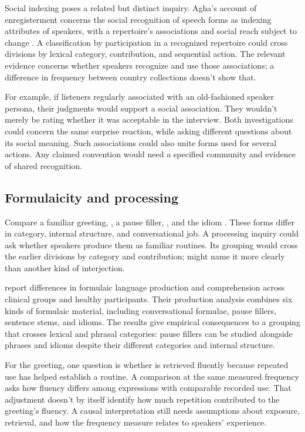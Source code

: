 \documentclass[12pt]{article}
\begin{document}
Social indexing poses a related but distinct inquiry. Agha's account
of enregisterment concerns the social recognition of speech forms as
indexing attributes of speakers, with a repertoire's associations and
social reach subject to change \citep[38--40]{agha2005}. A classification
by participation in a recognized repertoire could cross divisions by
lexical category, contribution, and sequential action. The relevant evidence concerns
whether speakers recognize and use those associations; a difference in
frequency between country collections doesn't show that.

For example, if listeners regularly associated  with an
old-fashioned speaker persona, their judgments would support a social
association. They wouldn't merely be rating whether it was acceptable
in the interview. Both investigations could concern the same surprise
reaction, while asking different questions about its social meaning.
Such associations could also unite forms used for several actions.
Any claimed convention would need a specified community and evidence
of shared recognition.

\subsection{Formulaicity and processing}

Compare a familiar greeting, , a pause filler,
, and the idiom . These forms differ
in category, internal structure, and conversational job. A processing inquiry
could ask whether speakers produce them as familiar routines.
Its grouping would cross the earlier divisions by category and contribution;
 might name it more clearly than another
kind of interjection.

\textcite{vanlanckersidtis2015} report differences in formulaic
language production and comprehension across clinical groups and
healthy participants. Their production
analysis combines six kinds of formulaic material, including conversational
formulae, pause fillers, sentence stems, and idioms. The results give
empirical consequences to a grouping that crosses lexical and phrasal
categories: pause fillers can be studied alongside phrases and idioms
despite their different categories and internal structure.

For the greeting, one question is whether  is
retrieved fluently because repeated use has helped establish a routine.
A comparison at the same measured frequency asks how fluency differs
among expressions with comparable recorded use. That adjustment doesn't
by itself identify how much repetition contributed to the greeting's
fluency. A causal interpretation still needs assumptions about exposure,
retrieval, and how the frequency measure relates to speakers' experience.
\end{document}
